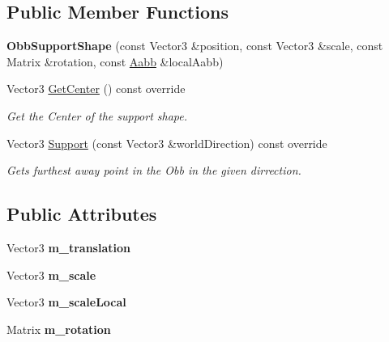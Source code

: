 \subsection*{Public Member Functions}
\begin{DoxyCompactItemize}
\item 
\mbox{\label{classObbSupportShape_a079d1b139368593624351a1a061a7d56}} 
{\bfseries Obb\+Support\+Shape} (const Vector3 \&position, const Vector3 \&scale, const Matrix \&rotation, const \hyperlink{classAabb}{Aabb} \&local\+Aabb)
\item 
Vector3 \hyperlink{classObbSupportShape_a0e18c90f510e3829d73e8b4478e68a81}{Get\+Center} () const override
\begin{DoxyCompactList}\small\item\em Get the Center of the support shape. \end{DoxyCompactList}\item 
Vector3 \hyperlink{classObbSupportShape_ae47da1aea42eedb3327bc71aa08a0d65}{Support} (const Vector3 \&world\+Direction) const override
\begin{DoxyCompactList}\small\item\em Gets furthest away point in the Obb in the given dirrection. \end{DoxyCompactList}\end{DoxyCompactItemize}
\subsection*{Public Attributes}
\begin{DoxyCompactItemize}
\item 
\mbox{\label{classObbSupportShape_a259da8ed9b5bbe16b6cf755c453b7e52}} 
Vector3 {\bfseries m\+\_\+translation}
\item 
\mbox{\label{classObbSupportShape_ad038412b2e8a47a570dd93c260c9eeb5}} 
Vector3 {\bfseries m\+\_\+scale}
\item 
\mbox{\label{classObbSupportShape_a665fb1c1863f1868478d1638d88d1b2d}} 
Vector3 {\bfseries m\+\_\+scale\+Local}
\item 
\mbox{\label{classObbSupportShape_a54e4e5cac1d6c941473fc918a5c54ac6}} 
Matrix {\bfseries m\+\_\+rotation}
\end{DoxyCompactItemize}


